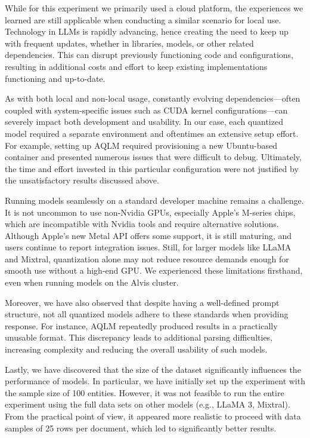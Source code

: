 \documentclass[conference]{IEEEtran}
\begin{document}
While for this experiment we primarily used a cloud platform, the experiences we learned are still applicable when conducting a similar scenario for local use. Technology in LLMs is rapidly advancing, hence creating the need to keep up with frequent updates, whether in libraries, models, or other related dependencies. This can disrupt previously functioning code and configurations, resulting in additional costs and effort to keep existing implementations functioning and up-to-date.

As with both local and non-local usage, constantly evolving dependencies---often coupled with system-specific issues such as CUDA kernel configurations---can severely impact both development and usability. In our case, each quantized model required a separate environment and oftentimes an extensive setup effort. For example, setting up AQLM required provisioning a new Ubuntu-based container and presented numerous issues that were difficult to debug. Ultimately, the time and effort invested in this particular configuration were not justified by the unsatisfactory results discussed above.

Running models seamlessly on a standard developer machine remains a challenge. It is not uncommon to use non-Nvidia GPUs, especially Apple’s M-series chips, which are incompatible with Nvidia tools and require alternative solutions. Although Apple’s new Metal API offers some support, it is still maturing, and users continue to report integration issues. Still, for larger models like LLaMA and Mixtral, quantization alone may not reduce resource demands enough for smooth use without a high-end GPU. We experienced these limitations firsthand, even when running models on the Alvis cluster.

Moreover, we have also observed that despite having a well-defined prompt structure, not all quantized models adhere to these standards when providing response. For instance, AQLM repeatedly produced results in a practically unusable format. This discrepancy leads to additional parsing difficulties, increasing complexity and reducing the overall usability of such models.

Lastly, we have discovered that the size of the dataset significantly influences the performance of models. In particular, we have initially set up the experiment with the sample size of 100 entities. However, it was not feasible to run the entire experiment using the full data sets on other models (e.g., LLaMA 3, Mixtral). From the practical point of view, it appeared more realistic to proceed with data samples of 25 rows per document, which led to significantly better results.
\end{document}
